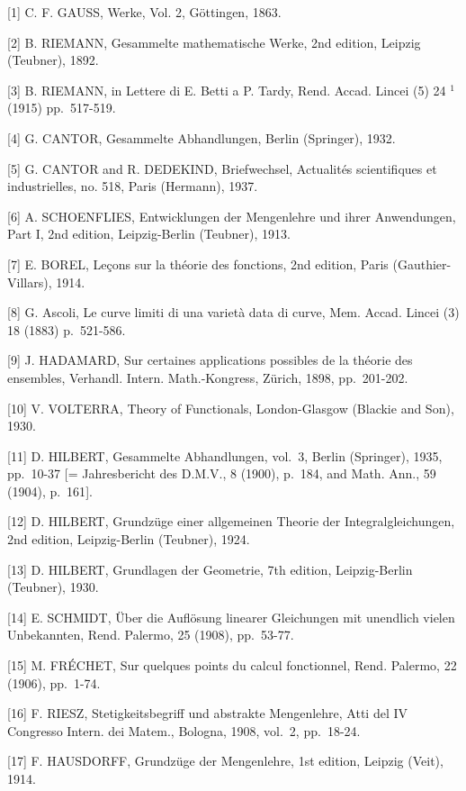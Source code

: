 
{[}1{]} C. F. GAUSS, Werke, Vol. 2, Göttingen, 1863.

{[}2{]} B. RIEMANN, Gesammelte mathematische Werke, 2nd edition, Leipzig (Teubner), 1892.

{[}3{]} B. RIEMANN, in Lettere di E. Betti a P. Tardy, Rend. Accad. Lincei (5) 24 \(^{1}\) (1915) pp.~517-519.

{[}4{]} G. CANTOR, Gesammelte Abhandlungen, Berlin (Springer), 1932.

{[}5{]} G. CANTOR and R. DEDEKIND, Briefwechsel, Actualités scientifiques et industrielles, no. 518, Paris (Hermann), 1937.

{[}6{]} A. SCHOENFLIES, Entwicklungen der Mengenlehre und ihrer Anwendungen, Part I, 2nd edition, Leipzig-Berlin (Teubner), 1913.

{[}7{]} E. BOREL, Leçons sur la théorie des fonctions, 2nd edition, Paris (Gauthier-Villars), 1914.

{[}8{]} G. Ascoli, Le curve limiti di una varietà data di curve, Mem. Accad. Lincei (3) 18 (1883) p.~521-586.

{[}9{]} J. HADAMARD, Sur certaines applications possibles de la théorie des ensembles, Verhandl. Intern. Math.-Kongress, Zürich, 1898, pp.~201-202.

{[}10{]} V. VOLTERRA, Theory of Functionals, London-Glasgow (Blackie and Son), 1930.

{[}11{]} D. HILBERT, Gesammelte Abhandlungen, vol.~3, Berlin (Springer), 1935, pp.~10-37 {[}= Jahresbericht des D.M.V., 8 (1900), p.~184, and Math. Ann., 59 (1904), p.~161{]}.

{[}12{]} D. HILBERT, Grundzüge einer allgemeinen Theorie der Integralgleichungen, 2nd edition, Leipzig-Berlin (Teubner), 1924.

{[}13{]} D. HILBERT, Grundlagen der Geometrie, 7th edition, Leipzig-Berlin (Teubner), 1930.

{[}14{]} E. SCHMIDT, Über die Auflösung linearer Gleichungen mit unendlich vielen Unbekannten, Rend. Palermo, 25 (1908), pp.~53-77.

{[}15{]} M. FRÉCHET, Sur quelques points du calcul fonctionnel, Rend. Palermo, 22 (1906), pp.~1-74.

{[}16{]} F. RIESZ, Stetigkeitsbegriff und abstrakte Mengenlehre, Atti del IV Congresso Intern. dei Matem., Bologna, 1908, vol.~2, pp.~18-24.

{[}17{]} F. HAUSDORFF, Grundzüge der Mengenlehre, 1st edition, Leipzig (Veit), 1914.

